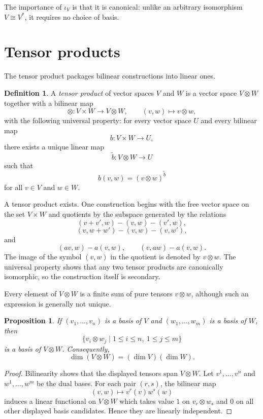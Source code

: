 \documentclass{amsbook}
\newtheorem{proposition}[theorem]{Proposition}
\theoremstyle{definition}
\newtheorem{definition}[theorem]{Definition}
\theoremstyle{remark}
\numberwithin{section}{chapter}
\numberwithin{equation}{chapter}
\begin{document}
The importance of $\iota_V$ is that it is canonical: unlike an arbitrary isomorphism $V\cong V^*$, it requires no choice of basis.

\section{Tensor products}

The tensor product packages bilinear constructions into linear ones.

\begin{definition}
A \emph{tensor product} of vector spaces $V$ and $W$ is a vector space $V\otimes W$ together with a bilinear map
\[
\otimes\colon V\times W\longrightarrow V\otimes W,
\qquad
(v,w)\longmapsto v\otimes w,
\]
with the following universal property: for every vector space $U$ and every bilinear map
\[
b\colon V\times W\to U,
\]
there exists a unique linear map
\[
\widetilde b\colon V\otimes W\to U
\]
such that
\[
b(v,w)=(v\otimes w)^{\widetilde b}
\]
for all $v\in V$ and $w\in W$.
\end{definition}

A tensor product exists. One construction begins with the free vector space on the set $V\times W$ and quotients by the subspace generated by the relations
\[
(v+v',w)-(v,w)-(v',w),
\]
\[
(v,w+w')-(v,w)-(v,w'),
\]
and
\[
(av,w)-a(v,w),\qquad (v,aw)-a(v,w).
\]
The image of the symbol $(v,w)$ in the quotient is denoted by $v\otimes w$. The universal property shows that any two tensor products are canonically isomorphic, so the construction itself is secondary.

Every element of $V\otimes W$ is a finite sum of pure tensors $v\otimes w$, although such an expression is generally not unique.

\begin{proposition}\label{prop:tensor-basis}
If $(v_1,\dots,v_n)$ is a basis of $V$ and $(w_1,\dots,w_m)$ is a basis of $W$, then
\[
\{v_i\otimes w_j\mid 1\le i\le n,\ 1\le j\le m\}
\]
is a basis of $V\otimes W$. Consequently,
\[
\dim(V\otimes W)=(\dim V)(\dim W).
\]
\end{proposition}

\begin{proof}
Bilinearity shows that the displayed tensors span $V\otimes W$. Let $v^1,\dots,v^n$ and $w^1,\dots,w^m$ be the dual bases. For each pair $(r,s)$, the bilinear map
\[
(v,w)\longmapsto v^r(v)w^s(w)
\]
induces a linear functional on $V\otimes W$ which takes value $1$ on $v_r\otimes w_s$ and $0$ on all other displayed basis candidates. Hence they are linearly independent.
\end{proof}
\end{document}
